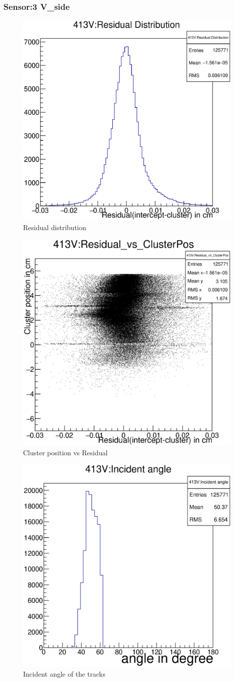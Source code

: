 \documentclass[12pt]{article}
\begin{document}
			\pagebreak
			\subsubsection{Sensor:3 V\_side}
			\begin{multicols}{3}
				\begin{figure}[H]
					\includegraphics[width=.3\textwidth]{413V:residualplot.eps}	
					\caption{Residual distribution}	
					\label{fig1}	
				\end{figure}
				\begin{figure}[H]
					\includegraphics[width=.3\textwidth]{413V:residual_vs_clusterpos.eps}	
					\caption{Cluster position vs Residual}	
					\label{fig2}	
				\end{figure}
				\begin{figure}[H]
					\includegraphics[width=.3\textwidth]{413V:incident_angle.eps}	
					\caption{Incident angle of the tracks}	
					\label{fig2}	
				\end{figure}
			\end{multicols}
			
\end{document}

